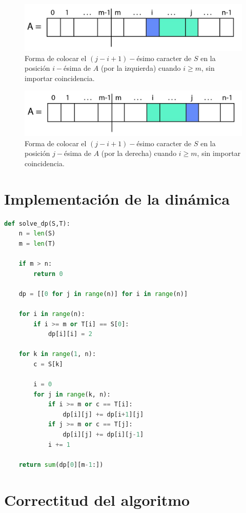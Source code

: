 \documentclass[a4paper]{article}
\begin{document}
    \begin{figure}[h!]
    	\centering
    	\includegraphics[width=0.7\linewidth]{ppp6}
    	\caption{Forma de colocar el $(j-i+1)-$ésimo caracter de $S$ en la posición $i-$ésima de $A$ (por la izquierda) cuando $i \ge m$, sin importar coincidencia.}
    	\label{fig:ppp6}
    \end{figure}
    \begin{figure}[h!]
    	\centering
    	\includegraphics[width=0.7\linewidth]{ppp7}
    	\caption{Forma de colocar el $(j-i+1)-$ésimo caracter de $S$ en la posición $j-$ésima de $A$ (por la derecha) cuando $i \ge m$, sin importar coincidencia.}
    	\label{fig:ppp7}
    \end{figure}

\section*{Implementación de la dinámica}
    
    
    \begin{lstlisting}[language=Python]
def solve_dp(S,T):
    n = len(S)
    m = len(T)
        
    if m > n:
        return 0
        
    dp = [[0 for j in range(n)] for i in range(n)]
    
    for i in range(n):
        if i >= m or T[i] == S[0]:
            dp[i][i] = 2
    
    for k in range(1, n):    
        c = S[k]
        
        i = 0        
        for j in range(k, n):
            if i >= m or c == T[i]:
                dp[i][j] += dp[i+1][j]
            if j >= m or c == T[j]:
                dp[i][j] += dp[i][j-1]            
            i += 1            
    
    return sum(dp[0][m-1:])
    \end{lstlisting}
	
	\section*{Correctitud del algoritmo}
	
\end{document}
